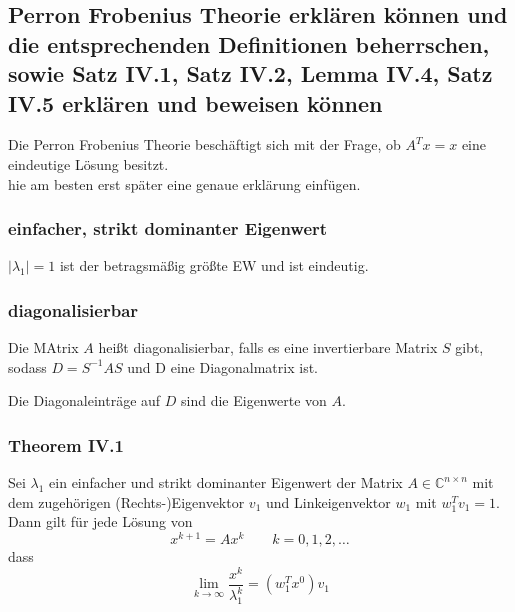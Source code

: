 \documentclass[]{article}
\begin{document}
\subsection*{Perron Frobenius Theorie erklären können und die entsprechenden Definitionen beherrschen, sowie Satz IV.1, Satz IV.2, Lemma IV.4, Satz IV.5 erklären und beweisen können}
Die Perron Frobenius Theorie beschäftigt sich mit der Frage, ob $A^T x = x$ eine eindeutige Lösung besitzt. \\

hie am besten erst später eine genaue erklärung einfügen. \\

\subsubsection*{einfacher, strikt dominanter Eigenwert}
$|\lambda_1|=1$ ist der betragsmäßig größte EW und ist eindeutig.

\subsubsection*{diagonalisierbar}
Die MAtrix $A$ heißt diagonalisierbar, falls es eine invertierbare Matrix $S$ gibt, sodass $D=S^{-1}AS$ und D eine Diagonalmatrix ist. 

Die Diagonaleinträge auf $D$ sind die Eigenwerte von $A$.  

\subsubsection*{Theorem IV.1}

Sei $\lambda_1$ ein einfacher und strikt dominanter Eigenwert der Matrix $A \in \mathbb{C}^{n \times n}$ mit dem zugehörigen (Rechts-)Eigenvektor $v_1$ und Linkeigenvektor $w_1$ mit $w_1^T v_1 = 1$. Dann gilt für jede Lösung von \[ x^{k+1} = A x^k \qquad k=0,1,2,\dotsc \]
dass
\begin{equation*}
\lim_{k \to \infty} \frac{x^k}{\lambda_1^k} = (w_1^T x^0 ) v_1
\end{equation*}
\end{document}

